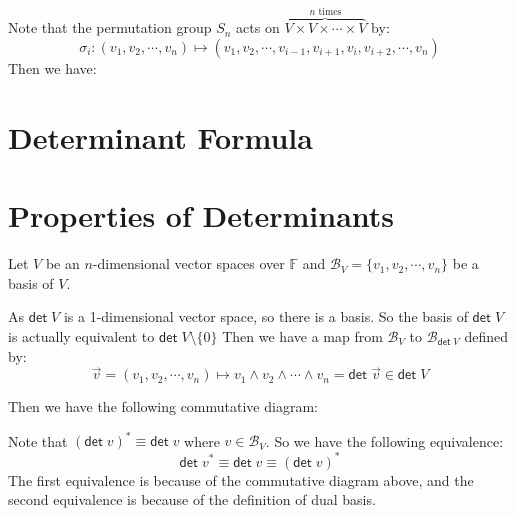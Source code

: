 \documentclass[
	11pt, %
	fleqn, %
	a4paper, %
]{LegrandOrangeBook}
\newcommand{\F}{\mathbb{F}} %
\newcommand{\B}{\mathcal{B}} %
\renewcommand{\det}{\mathsf{det\;}} %
\begin{document}
Note that the permutation group $S_n$ acts on $\overbrace{V \times V \times \cdots \times V}^{n \text{ times}}$ by:
\[
    \sigma_i : (v_1, v_2, \cdots, v_n) \mapsto (v_1, v_2, \cdots, v_{i - 1}, v_{i + 1}, v_i, v_{i + 2}, \cdots, v_n)
\]
Then we have:
\begin{center}
\end{center}

\newpage

\section{Determinant Formula}

\newpage

\section{Properties of Determinants}

Let $V$ be an $n$-dimensional vector spaces over $\F$ and $\B_V = \{ v_1, v_2, \cdots, v_n \}$ be a basis of $V$. 

As $\det V$ is a 1-dimensional vector space, so there is a basis. So the basis of $\det V$ is actually equivalent to $\det V \setminus \{ 0 \}$ Then we have a map from $\B_V$ to $\B_{\det V}$ defined by:
\[
    \vec{v} = (v_1, v_2, \cdots, v_n) \mapsto v_1 \wedge v_2 \wedge \cdots \wedge v_n = \det \vec{v} \in \det V
\]

Then we have the following commutative diagram:
\begin{center}
\end{center}

Note that $(\det v)^* \equiv \det v$ where $v \in \B_V$. So we have the following equivalence:
\[
    \det v^* \equiv \det v \equiv (\det v)^*
\]
The first equivalence is because of the commutative diagram above, and the second equivalence is because of the definition of dual basis.
\end{document}
